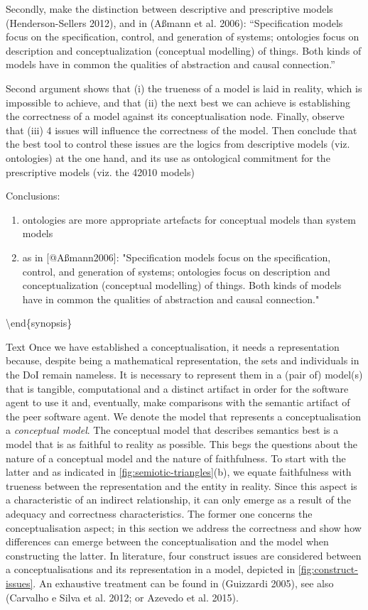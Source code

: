 \documentclass[a4paper,11pt,oneside,oldfontcommands]{memoir}
\theoremstyle{definition}
\theoremstyle{break}		%
\numberwithin{equation}{chapter}
\numberwithin{figure}{chapter}
\begin{document}
Secondly, make the distinction between descriptive and prescriptive
models (Henderson-Sellers 2012), and in (Aßmann et al. 2006):
``Specification models focus on the specification, control, and
generation of systems; ontologies focus on description and
conceptualization (conceptual modelling) of things. Both kinds of models
have in common the qualities of abstraction and causal connection.''

Second argument shows that (i) the trueness of a model is laid in
reality, which is impossible to achieve, and that (ii) the next best we
can achieve is establishing the correctness of a model against its
conceptualisation node. Finally, observe that (iii) 4 issues will
influence the correctness of the model. Then conclude that the best tool
to control these issues are the logics from descriptive models (viz.
ontologies) at the one hand, and its use as ontological commitment for
the prescriptive models (viz. the 42010 models)

Conclusions:

\begin{enumerate}
\item ontologies are more appropriate artefacts for conceptual models than system models
\item as in [@Aßmann2006]: "Specification models focus on the specification, control, and generation of systems; ontologies focus on description and conceptualization (conceptual modelling) of things. Both kinds of models have in common the qualities of abstraction and causal connection."
\end{enumerate}

\textbackslash{}end\{synopsis\}

Text Once we have established a conceptualisation, it needs a
representation because, despite being a mathematical representation, the
sets and individuals in the DoI remain nameless. It is necessary to
represent them in a (pair of) model(s) that is tangible, computational
and a distinct artifact in order for the software agent to use it and,
eventually, make comparisons with the semantic artifact of the peer
software agent. We denote the model that represents a conceptualisation
a \emph{conceptual model}. The conceptual model that describes semantics
best is a model that is as faithful to reality as possible. This begs
the questions about the nature of a conceptual model and the nature of
faithfulness. To start with the latter and as indicated in
\cref{fig:semiotic-triangles}(b), we equate faithfulness with trueness
between the representation and the entity in reality. Since this aspect
is a characteristic of an indirect relationship, it can only emerge as a
result of the adequacy and correctness characteristics. The former one
concerns the conceptualisation aspect; in this section we address the
correctness and show how differences can emerge between the
conceptualisation and the model when constructing the latter. In
literature, four construct issues are considered between a
conceptualisations and its representation in a model, depicted in
\cref{fig:construct-issues}. An exhaustive treatment can be found in
(Guizzardi 2005), see also (Carvalho e Silva et al. 2012; or Azevedo et
al. 2015).
\end{document}

